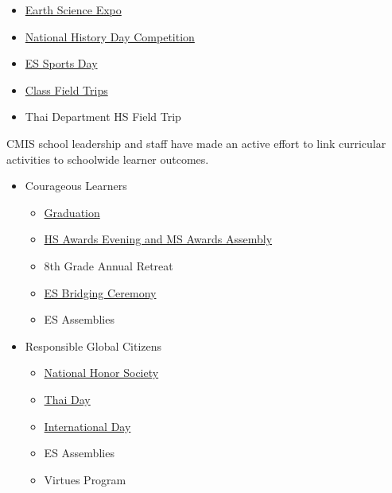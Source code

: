 \begin{findings}
\begin{itemize}
\item \href{http://blogs.cmis.ac.th/newsletter/2016/03/16/earth-science-expo-2016-march-30/}{Earth Science Expo}
\item \href{http://blogs.cmis.ac.th/newsletter/2016/03/21/cmis-student-take-top-awards-in-the-south-asia-division-of-the-national-history-day-competition/}{National History Day Competition}
\item \href{http://gallery.cmis.ac.th/2016-2017/Elementary-Sports-Day/}{ES Sports Day}
\item \href{http://gallery.cmis.ac.th/2016-2017/science_waterfall_fieldtrip/}{Class Field Trips}
\item Thai Department HS Field Trip
\end{itemize}

CMIS school leadership and staff have made an active effort to link curricular activities to schoolwide learner outcomes.

\begin{itemize}
\item Courageous Learners
\begin{itemize}
\item \href{http://gallery.cmis.ac.th/2015-2016/graduation/}{Graduation}
\item \href{http://blogs.cmis.ac.th/newsletter/2016/05/12/save-the-date-may-24-hsms-awards-events/}{HS Awards Evening and MS Awards Assembly}
\item 8th Grade Annual Retreat
\item \href{http://gallery.cmis.ac.th/2015-2016/bridging_ceremony/}{ES Bridging Ceremony}
\item ES Assemblies
\end{itemize}
\item Responsible Global Citizens
\begin{itemize}
\item \href{http://blogs.cmis.ac.th/newsletter/2016/11/04/cmis-proud-to-be-a-member-school-of-the-national-honor-society/}{National Honor Society}
\item \href{http://blogs.cmis.ac.th/newsletter/2015/02/18/cmis-thai-day-2015/}{Thai Day}
\item \href{http://blogs.cmis.ac.th/newsletter/2016/02/05/cmis-international-day-friday-february-19/}{International Day}
\item ES Assemblies
\item Virtues Program
\end{itemize}
\end{itemize}


\end{findings}
